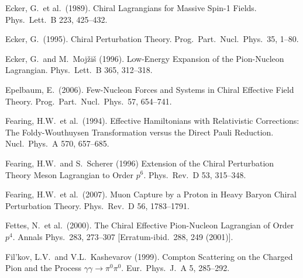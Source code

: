 \documentclass[twoside,12pt]{article}
\begin{document}
\begin{thebibliography}{}
Ecker, G.~et al.~(1989).
Chiral Lagrangians for Massive Spin-1 Fields.
Phys.\ Lett.\  B 223, 425--432.

Ecker, G.~(1995).
Chiral Perturbation Theory.
Prog.\ Part.\ Nucl.\ Phys.\  35, 1--80.

Ecker, G.~and M.~Moj\v{z}i\v{s} (1996).
Low-Energy Expansion of the Pion-Nucleon Lagrangian.
Phys.\ Lett.\  B 365, 312--318.

Epelbaum, E.~(2006).
Few-Nucleon Forces and Systems in Chiral Effective Field Theory.
Prog.\ Part.\ Nucl.\ Phys.\  57, 654--741.

Fearing, H.W.~et al.~(1994).
Effective Hamiltonians with Relativistic Corrections: The
Foldy-Wouthuysen Transformation versus the Direct Pauli Reduction.
Nucl.\ Phys.\  A 570, 657--685.

Fearing, H.W.~and S.~Scherer (1996)
Extension of the Chiral Perturbation Theory Meson Lagrangian to Order
$p^6$.
Phys.\ Rev.\  D 53, 315--348.

Fearing, H.W.~et al.~(2007).
Muon Capture by a Proton in Heavy Baryon Chiral Perturbation Theory.
Phys.\ Rev.\  D 56, 1783--1791.

Fettes, N.~et al.~(2000).
The Chiral Effective Pion-Nucleon Lagrangian of Order $p^4$.
Annals Phys.\ 283, 273--307
[Erratum-ibid.\ 288, 249 (2001)].

Fil'kov, L.V.~and V.L.~Kashevarov (1999).
Compton Scattering on the Charged Pion and the Process $\gamma \gamma \to\pi^0\pi^0$.
Eur.\ Phys.\ J.\  A 5, 285--292.


\end{thebibliography}
\end{document}
